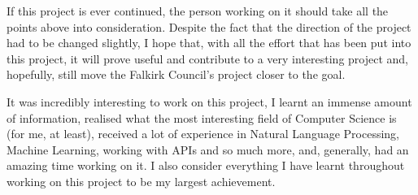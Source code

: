 If this project is ever continued, the person working on it should take all the points above into consideration. Despite the fact that the direction of the project had to be changed slightly, I hope that, with all the effort that has been put into this project, it will prove useful and contribute to a very interesting project and, hopefully, still move the Falkirk Council's project closer to the goal. 

It was incredibly interesting to work on this project, I learnt an immense amount of information, realised what the most interesting field of Computer Science is (for me, at least), received a lot of experience in Natural Language Processing, Machine Learning, working with APIs and so much more, and, generally, had an amazing time working on it. I also consider everything I have learnt throughout working on this project to be my largest achievement. 
